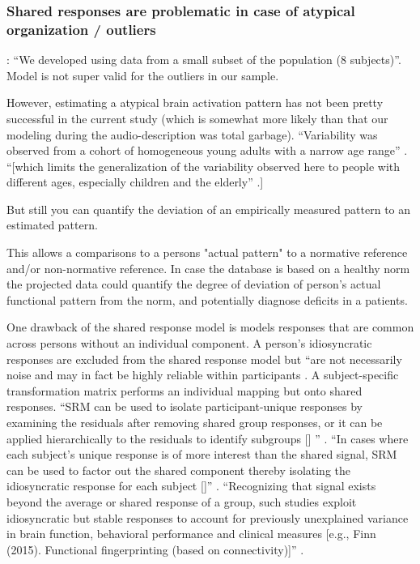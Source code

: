 \subsubsection{Shared responses are problematic in case of atypical organization
/ outliers}

\citet{benson2018bayesian}: ``We developed using data from a small subset of the
population (8 subjects)''.
%
Model is not super valid for the outliers in our sample.

%
However, estimating a atypical brain activation pattern has not been pretty
successful in the current study (which is somewhat more likely than that our
modeling during the audio-description was total garbage).
%
``Variability was observed from a cohort of homogeneous young adults with a
narrow age range'' \citep{zhen2017quantifying}.
%
``[which limits the generalization of the variability observed here to people
with different ages, especially children and the elderly''
\citet{zhen2017quantifying}.]

%
But still you can quantify the deviation of an empirically measured pattern to
an estimated pattern.

%
This allows a comparisons to a persons "actual pattern" to a normative reference
and/or non-normative reference.
%
In case the database is based on a healthy norm the projected data could
quantify the degree of deviation of person's actual functional pattern from the
norm, and potentially diagnose deficits in a patients.

%
One drawback of the shared response model is models responses that are common
across persons without an individual component.
%
A person's idiosyncratic responses are excluded from the shared response model
but ``are not necessarily noise and may in fact be highly reliable within
participants \citep{cohen2017computational}.
%
A subject-specific transformation matrix performs an individual mapping but onto
shared responses.
%
``SRM can be used to isolate participant-unique responses by examining the
residuals after removing shared group responses, or it can be applied
hierarchically to the residuals to identify subgroups [\citet{chen2017shared}]
'' \citep{cohen2017computational}.
%
``In cases where each subject's unique response is of more interest than the
shared signal, SRM can be used to factor out the shared component thereby
isolating the idiosyncratic response for each subject
[\citep{chen2015reduced}]'' \citep{kumar2020brainiak}.
%
``Recognizing that signal exists beyond the average or shared response of a
group, such studies exploit idiosyncratic but stable responses to account for
previously unexplained variance in brain function, behavioral performance and
clinical measures [e.g., Finn (2015). Functional fingerprinting (based on
connectivity)]'' \citep{cohen2017computational}.

